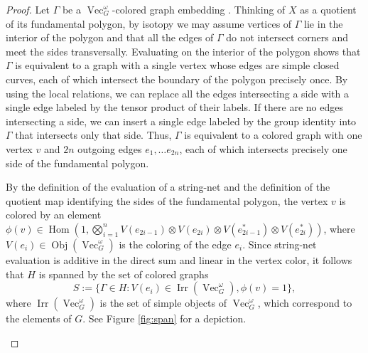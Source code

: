 \documentclass{amsart}
\DeclareMathOperator{\Vect}{Vec}
\DeclareMathOperator{\Hom}{Hom}
\DeclareMathOperator{\Obj}{Obj}
\DeclareMathOperator{\Irr}{Irr}
\begin{document}
\begin{proof}
Let $\Gamma$ be a $\Vect_G^\omega$-colored graph embedding . Thinking of $X$ as a quotient of its fundamental polygon, by isotopy we may assume vertices of $\Gamma$ lie in the interior of the polygon and that all the edges of $\Gamma$ do not intersect corners and meet the sides transversally.  Evaluating on the interior of the polygon shows that $\Gamma$ is equivalent to a graph with a single vertex whose edges are simple closed curves, each of which intersect the boundary of the polygon precisely once.  By using the local relations, we can replace all the edges intersecting a side with a single edge labeled by the tensor product of their labels.  If there are no edges intersecting a side, we can insert a single edge labeled by the group identity into $\Gamma$ that intersects only that side.  Thus, $\Gamma$ is equivalent to a colored graph with one vertex $v$ and $2n$ outgoing edges $e_1, \ldots e_{2n}$, each of which intersects precisely one side of the fundamental polygon.

By the definition of the evaluation of a string-net and the definition of the quotient map identifying the sides of the fundamental polygon, the vertex $v$ is colored by an element $\phi(v) \in \Hom (1, \bigotimes_{i=1}^n V(e_{2i-1}) \otimes V(e_{2i})  \otimes V(e_{2i-1}^*) \otimes V(e_{2i}^*))$, where $V(e_i) \in \Obj(\Vect_G^\omega)$ is the coloring of the edge $e_i$.  Since string-net evaluation is additive in the direct sum and linear in the vertex color, it follows that $H$ is spanned by the set of colored graphs
$$ S := \{\Gamma \in H : V(e_i) \in \Irr(\Vect_G^\omega), \phi(v) = 1 \}, $$
where $\Irr(\Vect_G^\omega)$ is the set of simple objects of $\Vect_G^\omega$, which correspond to the elements of $G$.  See Figure \ref{fig:span} for a depiction.

\newdimen\R
\R=0.8cm

\begin{figure}
\centering
\end{figure}
\end{proof}
\end{document}
